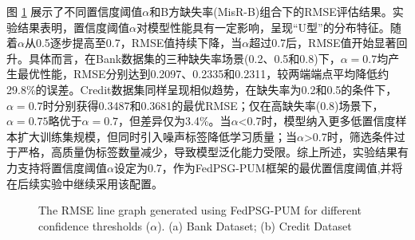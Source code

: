 图 \ref{Chapter4Exp1Setting3} 展示了不同置信度阈值$\alpha$和B方缺失率(MisR-B)组合下的RMSE评估结果。实验结果表明，置信度阈值$\alpha$对模型性能具有一定影响，呈现“U型”的分布特征。随着$\alpha$从0.5逐步提高至0.7，RMSE值持续下降，当$\alpha$超过0.7后，RMSE值开始显著回升。具体而言，在Bank数据集的三种缺失率场景(0.2、0.5和0.8)下，$\alpha=0.7$均产生最优性能，RMSE分别达到0.2097、0.2335和0.2311，较两端端点平均降低约29.8\%的误差。Credit数据集同样呈现相似趋势，在缺失率为0.2和0.5的条件下，$\alpha=0.7$时分别获得0.3487和0.3681的最优RMSE；仅在高缺失率(0.8)场景下，$\alpha=0.75$略优于$\alpha=0.7$，但差异仅为3.4\%。当$\alpha$<0.7时，模型纳入更多低置信度样本扩大训练集规模，但同时引入噪声标签降低学习质量；当$\alpha$>0.7时，筛选条件过于严格，高质量伪标签数量减少，导致模型泛化能力受限。综上所述，实验结果有力支持将置信度阈值$\alpha$设定为0.7，作为FedPSG-PUM框架的最优置信度阈值,并将在后续实验中继续采用该配置。

\vspace{-0.1cm}
\begin{figure}[!h]
	\centering
	\hspace{0.01\textwidth}  %
	
	{\centering \wuhao The RMSE line graph generated using FedPSG-PUM for different confidence thresholds ($\alpha$). (a) Bank Dataset; (b) Credit Dataset}    
	\label{Chapter4Exp1Setting3}
\end{figure}
\vspace{-0.4cm}


